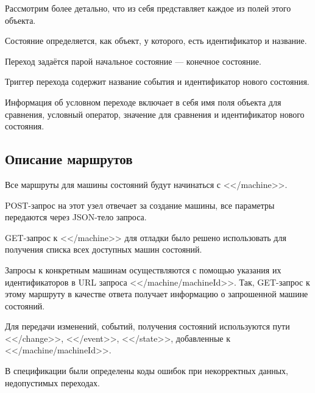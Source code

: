 \documentclass{hse_document}
\begin{document}
Рассмотрим более детально, что из себя представляет каждое из полей этого объекта.

Состояние определяется, как объект, у которого, есть идентификатор и название.

Переход задаётся парой начальное состояние --- конечное состояние.

Триггер перехода содержит название события и идентификатор нового состояния.

Информация об условном переходе включает в себя имя поля объекта для сравнения, условный оператор, значение для сравнения и идентификатор нового состояния.

\subsection{Описание маршрутов}

Все маршруты для машины состояний будут начинаться с <</machine>>.

POST-запрос на этот узел отвечает за создание машины, все параметры передаются через JSON-тело запроса.

GET-запрос к <</machine>> для отладки было решено использовать для получения списка всех доступных машин состояний.

Запросы к конкретным машинам осуществляются с помощью указания их идентификаторов в URL запроса <</machine/{machineId}>>. Так, GET-запрос к этому маршруту в качестве ответа получает информацию о запрошенной машине состояний.

Для передачи изменений, событий, получения состояний используются пути <</change>>, <</event>>, <</state>>, добавленные к <</machine/{machineId}>>.

В спецификации были определены коды ошибок при некорректных данных, недопустимых переходах.
\end{document}
